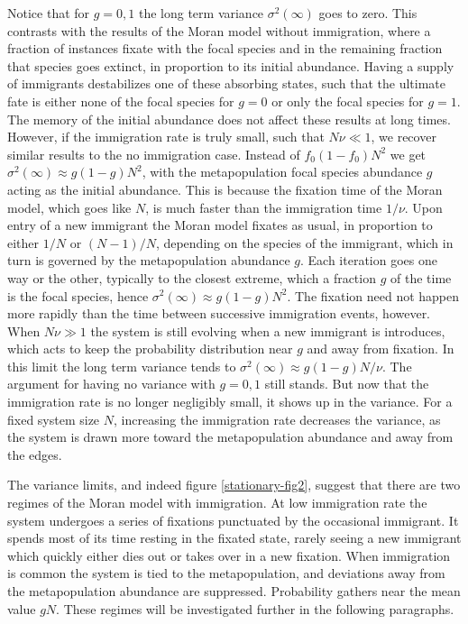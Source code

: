 Notice that for $g=0,1$ the long term variance $\sigma^2(\infty)$ goes to zero. 
This contrasts with the results of the Moran model without immigration, where a fraction of instances fixate with the focal species and in the remaining fraction that species goes extinct, in proportion to its initial abundance. 
Having a supply of immigrants destabilizes one of these absorbing states, such that the ultimate fate is either none of the focal species for $g=0$ or only the focal species for $g=1$. 
The memory of the initial abundance does not affect these results at long times. 
However, if the immigration rate is truly small, such that $N\nu\ll 1$, we recover similar results to the no immigration case. 
Instead of $f_0(1-f_0)N^2$ we get $\sigma^2(\infty) \approx g(1-g) N^2$, with the metapopulation focal species abundance $g$ acting as the initial abundance. 
This is because the fixation time of the Moran model, which goes like $N$, is much faster than the immigration time $1/\nu$. 
Upon entry of a new immigrant the Moran model fixates as usual, in proportion to either $1/N$ or $(N-1)/N$, depending on the species of the immigrant, which in turn is governed by the metapopulation abundance $g$. 
Each iteration goes one way or the other, typically to the closest extreme, which a fraction $g$ of the time is the focal species, hence $\sigma^2(\infty) \approx g(1-g) N^2$. 
The fixation need not happen more rapidly than the time between successive immigration events, however. 
When $N\nu\gg 1$ the system is still evolving when a new immigrant is introduces, which acts to keep the probability distribution near $g$ and away from fixation. 
In this limit the long term variance tends to $\sigma^2(\infty) \approx g(1-g) N/\nu$. 
The argument for having no variance with $g=0,1$ still stands. %
But now that the immigration rate is no longer negligibly small, it shows up in the variance. 
For a fixed system size $N$, increasing the immigration rate decreases the variance, as the system is drawn more toward the metapopulation abundance and away from the edges. 

The variance limits, and indeed figure \ref{stationary-fig2}, suggest that there are two regimes of the Moran model with immigration. 
At low immigration rate the system undergoes a series of fixations punctuated by the occasional immigrant. It spends most of its time resting in the fixated state, rarely seeing a new immigrant which quickly either dies out or takes over in a new fixation. 
When immigration is common the system is tied to the metapopulation, and deviations away from the metapopulation abundance are suppressed. 
Probability gathers near the mean value $gN$. 
These regimes will be investigated further in the following paragraphs. 

